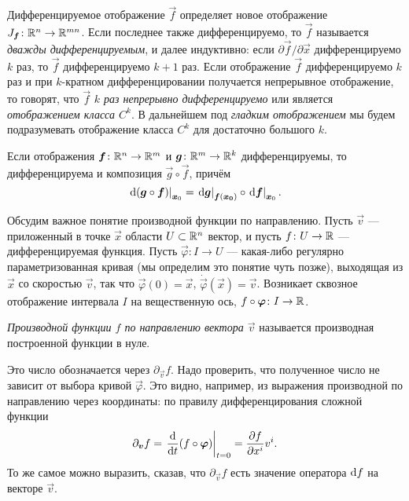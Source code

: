 Дифференцируемое отображение $\vec{f}$ определяет новое отображение $J_{\boldsymbol{f}}\colon \mathbb{R}^n \to \mathbb{R}^{mn}$. Если последнее также дифференцируемо, то $\vec{f}$ называется \textit{дважды дифференцируемым}, и далее индуктивно: если $\partial\vec{f} / \partial\vec{x}$ дифференцируемо $k$ раз, то $\vec{f}$ дифференцируемо $k + 1$ раз. Если отображение $\vec{f}$ дифференцируемо $k$ раз и при $k$-кратном дифференцировании получается непрерывное отображение, то говорят, что $\vec{f}$ \textit{$k$ раз непрерывно дифференцируемо} или является \textit{отображением класса $C^k$}. В дальнейшем под \textit{гладким отображением} мы будем подразумевать отображение класса $C^k$ для достаточно большого $k$.

\begin{theorem}
	Если отображения $\boldsymbol{f}\colon \mathbb{R}^n \to \mathbb{R}^m$ и $\boldsymbol{g}\colon \mathbb{R}^m \to \mathbb{R}^k$ дифференцируемы, то дифференцируема и композиция $\vec{g} \circ \vec{f}$, причём
	\[
		\left.\mathop{}\!\mathrm{d}(\boldsymbol{g} \circ \boldsymbol{f})\right|_{\boldsymbol{x}_0} = \left.\mathop{}\!\mathrm{d}\boldsymbol{g}\right|_{\boldsymbol{f}(\boldsymbol{x_0})} \circ \left.\mathop{}\!\mathrm{d}\boldsymbol{f}\right|_{\boldsymbol{x}_0}.
	\]
\end{theorem}

Обсудим важное понятие производной функции по направлению. Пусть $\vec{v}$ --- приложенный в точке $\vec{x}$ области $U \subset \mathbb{R}^n$ вектор, и пусть $f\colon U \to \mathbb{R}$ --- дифференцируемая функция. Пусть $\vec{\varphi}\colon I \to U$ --- какая-либо регулярно параметризованная кривая (мы определим это понятие чуть позже), выходящая из $\vec{x}$ со скоростью $\vec{v}$, так что $\vec{\varphi}(0) = \vec{x}$, $\dot{\vec{\varphi}}(\vec{x}) = \vec{v}$. Возникает сквозное отображение интервала $I$ на вещественную ось, $f \circ \boldsymbol{\varphi}\colon I \to \mathbb{R}$.

\begin{definition}
	\textit{Производной функции $f$ по направлению вектора $\vec{v}$} называется производная построенной функции в нуле.
\end{definition}

Это число обозначается через $\partial_{\vec{v}}f$. Надо проверить, что полученное число не зависит от выбора кривой $\vec{\varphi}$. Это видно, например, из выражения производной по направлению через координаты: по правилу дифференцирования сложной функции
\[
	\partial_{\boldsymbol{v}}f = \left.\frac{\mathop{}\!\mathrm{d}}{\mathop{}\!\mathrm{d} t}(f \circ \boldsymbol{\varphi})\right|_{t = 0} = \frac{\partial f}{\partial x^i}v^i.
\]
То же самое можно выразить, сказав, что $\partial_{\vec{v}}f$ есть значение оператора $\mathop{}\!\mathrm{d} f$ на векторе $\vec{v}$.

